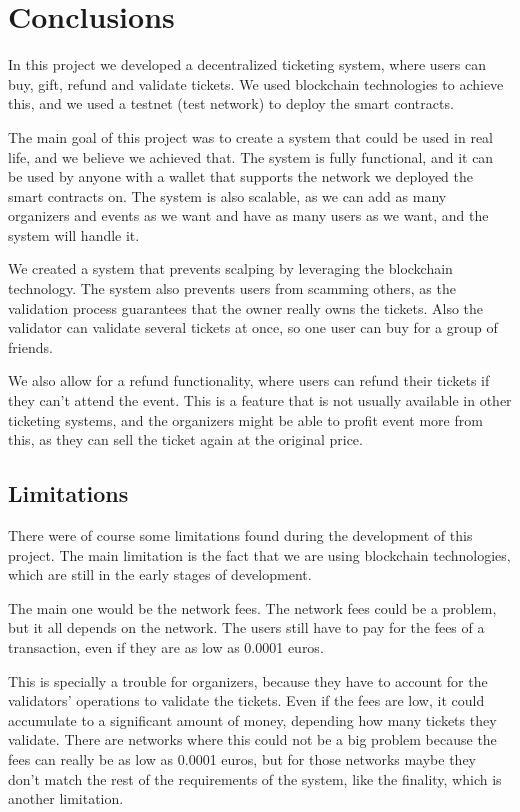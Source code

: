 \chapter{Conclusions}
\label{ch:conclusions}

In this project we developed a decentralized ticketing system, where users can
buy, gift, refund and validate tickets. We used blockchain technologies to
achieve this, and we used a testnet (test network) to deploy the smart
contracts.

The main goal of this project was to create a system that could be used in real
life, and we believe we achieved that. The system is fully functional, and it
can be used by anyone with a wallet that supports the network we deployed the
smart contracts on. The system is also scalable, as we can add as many
organizers and events as we want and have as many users as we want, and the
system will handle it.

We created a system that prevents scalping by leveraging the blockchain
technology. The system also prevents users from scamming others, as the
validation process guarantees that the owner really owns the tickets. Also the
validator can validate several tickets at once, so one user can buy for a group
of friends.

We also allow for a refund functionality, where users can refund their tickets
if they can't attend the event. This is a feature that is not usually available
in other ticketing systems, and the organizers might be able to profit event
more from this, as they can sell the ticket again at the original price.

\section{Limitations}
\label{sec:limitations}

There were of course some limitations found during the development of this
project. The main limitation is the fact that we are using blockchain
technologies, which are still in the early stages of development.

The main one would be the network fees. The network fees could be a problem,
but it all depends on the network. The users still have to pay for the fees of
a transaction, even if they are as low as 0.0001 euros.

This is specially a trouble for organizers, because they have to account for
the validators' operations to validate the tickets. Even if the fees are low,
it could accumulate to a significant amount of money, depending how many
tickets they validate. There are networks where this could not be a big problem
because the fees can really be as low as 0.0001 euros, but for those networks
maybe they don't match the rest of the requirements of the system, like the
finality, which is another limitation.


